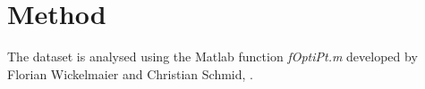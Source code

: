 \section*{Method}
\label{Method}
%
The dataset is analysed using the Matlab function \textit{fOptiPt.m} developed by Florian Wickelmaier and Christian Schmid, \parencite{Wickelmaier2004}.